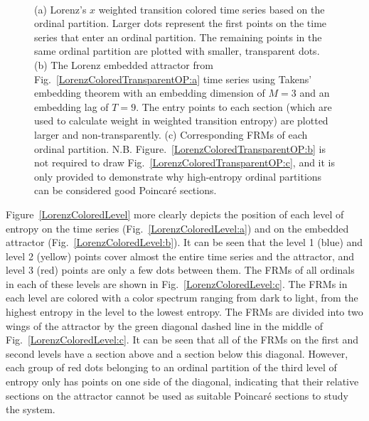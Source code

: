 \documentclass[%
 aip,
 amsmath,amssymb,
 reprint,%
]{revtex4-1}
\begin{document}
\begin{figure}[htbp]
{        \label{LorenzColoredTransparentOP:b}}\\[-1pt]
    \caption{(a) Lorenz's $x$ weighted transition colored time series based on the ordinal partition. Larger dots represent the first points on the time series that enter an ordinal partition. The remaining points in the same ordinal partition are plotted with smaller, transparent dots. (b) The Lorenz embedded attractor from Fig.~\ref{LorenzColoredTransparentOP:a} time series using Takens' embedding theorem with an embedding dimension of $M=3$ and an embedding lag of $T = 9$. The entry points to each section (which are used to calculate weight in weighted transition entropy) are plotted larger and non-transparently. (c) Corresponding FRMs of each ordinal partition. N.B. Figure.~\ref{LorenzColoredTransparentOP:b} is not required to draw Fig.~\ref{LorenzColoredTransparentOP:c}, and it is only provided to demonstrate why high-entropy ordinal partitions can be considered good Poincar\'e sections.}
    \label{LorenzColoredTransparentOP}
\end{figure}

Figure~\ref{LorenzColoredLevel} more clearly depicts the position of each level of entropy on the time series (Fig.~\ref{LorenzColoredLevel:a}) and on the embedded attractor (Fig.~\ref{LorenzColoredLevel:b}). It can be seen that the level 1 (blue) and level 2 (yellow) points cover almost the entire time series and the attractor, and level 3 (red) points are only a few dots between them. The FRMs of all ordinals in each of these levels are shown in Fig.~\ref{LorenzColoredLevel:c}. The FRMs in each level are colored with a color spectrum ranging from dark to light, from the highest entropy in the level to the lowest entropy. The FRMs are divided into two wings of the attractor by the green diagonal dashed line in the middle of Fig.~\ref{LorenzColoredLevel:c}. It can be seen that all of the FRMs on the first and second levels have a section above and a section below this diagonal. However, each group of red dots belonging to an ordinal partition of the third level of entropy only has points on one side of the diagonal, indicating that their relative sections on the attractor cannot be used as suitable Poincar\'e sections to study the system.
\end{document}
